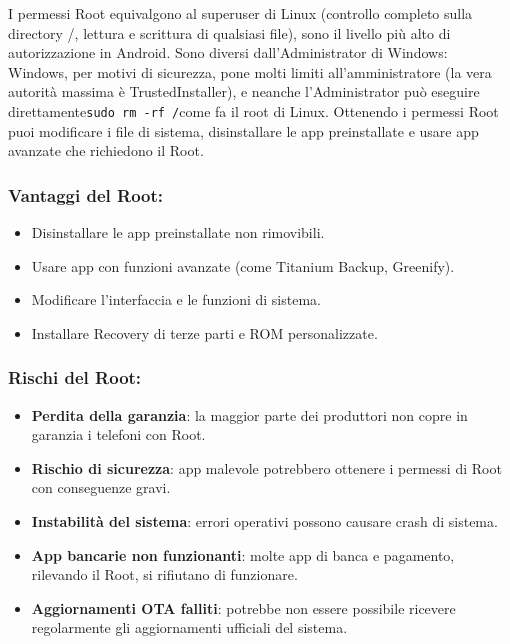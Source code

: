 
I permessi Root equivalgono al superuser di Linux (controllo completo sulla directory /, lettura e scrittura di qualsiasi file), sono il livello più alto di autorizzazione in Android. Sono diversi dall'Administrator di Windows: Windows, per motivi di sicurezza, pone molti limiti all'amministratore (la vera autorità massima è TrustedInstaller), e neanche l'Administrator può eseguire direttamente\texttt{sudo rm -\allowbreak rf /\allowbreak *}come fa il root di Linux. Ottenendo i permessi Root puoi modificare i file di sistema, disinstallare le app preinstallate e usare app avanzate che richiedono il Root.

\subsubsection*{Vantaggi del Root:}

\begin{itemize}
  \item Disinstallare le app preinstallate non rimovibili.
  \item Usare app con funzioni avanzate (come Titanium Backup, Greenify).
  \item Modificare l'interfaccia e le funzioni di sistema.
  \item Installare Recovery di terze parti e ROM personalizzate.
\end{itemize}

\subsubsection*{Rischi del Root:}

\begin{itemize}
  \item \textbf{Perdita della garanzia}: la maggior parte dei produttori non copre in garanzia i telefoni con Root.
  \item \textbf{Rischio di sicurezza}: app malevole potrebbero ottenere i permessi di Root con conseguenze gravi.
  \item \textbf{Instabilità del sistema}: errori operativi possono causare crash di sistema.
  \item \textbf{App bancarie non funzionanti}: molte app di banca e pagamento, rilevando il Root, si rifiutano di funzionare.
  \item \textbf{Aggiornamenti OTA falliti}: potrebbe non essere possibile ricevere regolarmente gli aggiornamenti ufficiali del sistema.
\end{itemize}

